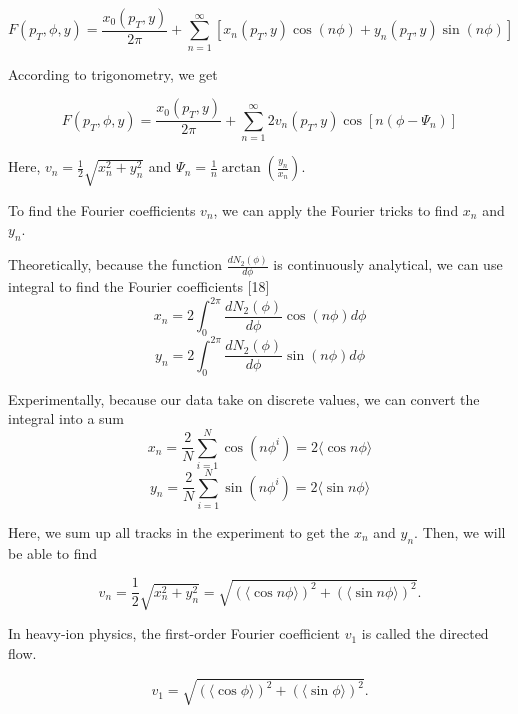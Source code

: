 \begin{equation}
F(p_T,\phi,y) = \frac{x_0(p_T,y)}{2\pi}  + \sum_{n=1}^{\infty}[x_n(p_T,y)\cos(n\phi)+y_n(p_T,y)\sin(n\phi)] 
\end{equation}

According to trigonometry, we get

\begin{equation}
F(p_T,\phi,y)  = \frac{x_0(p_T,y)}{2\pi} + \sum_{n=1}^{\infty}2v_n(p_T,y)\cos[n(\phi - \Psi_{n})]
\end{equation}

Here, $v_n = \frac{1}{2} \sqrt{x_n^2 + y_n^2}$ and $\Psi_{n} =\frac{1}{n} \arctan(\frac{y_n}{x_n})$. 

To find the Fourier coefficients $v_n$, we can apply the Fourier tricks to find $x_n$ and $y_n$.


Theoretically, because the function $\frac{dN_2(\phi)}{d\phi}$ is continuously analytical, we can use integral to find the Fourier coefficients [18] 
\begin{equation}
x_n =2\int_{0}^{2\pi} \frac{dN_2(\phi)}{d\phi}\cos(n\phi)d\phi 
\end{equation}
\begin{equation}
y_n =2\int_{0}^{2\pi} \frac{dN_2(\phi)}{d\phi}\sin(n\phi)d\phi 
\end{equation}

Experimentally, because our data take on discrete values, we can convert the integral into a sum 
\begin{equation}
x_n =\frac{2}{N}\sum_{i=1}^{N} \cos(n\phi^i) = 2\langle \cos n\phi \rangle
\end{equation}
\begin{equation}
y_n =\frac{2}{N}\sum_{i=1}^{N} \sin(n\phi^i) = 2\langle \sin n\phi \rangle
\end{equation}

Here, we sum up all tracks in the experiment to get the $x_n$ and $y_n$. Then, we will be able to find 

\begin{equation}
v_n = \frac{1}{2} \sqrt{x_n^2 + y_n^2} = \sqrt{(\langle \cos n\phi \rangle)^2+(\langle \sin n\phi \rangle)^2}. 
\end{equation}




In heavy-ion physics, the first-order Fourier coefficient $v_1$ is called the directed flow. 

\begin{equation}
v_1 =  \sqrt{(\langle \cos \phi \rangle)^2+(\langle \sin \phi \rangle)^2}. 
\end{equation}

